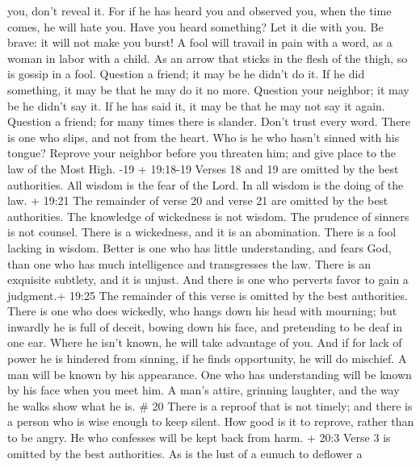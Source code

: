 you, don't reveal it.  For if he has heard you and observed
you, when the time comes, he will hate you.  Have you heard
something? Let it die with you. Be brave: it will not make you burst!
 A fool will travail in pain with a word, as a woman in
labor with a child.  As an arrow that sticks in the flesh
of the thigh, so is gossip in a fool.  Question a friend;
it may be he didn't do it. If he did something, it may be that he may do
it no more.  Question your neighbor; it may be he didn't
say it. If he has said it, it may be that he may not say it again.
 Question a friend; for many times there is slander. Don't
trust every word.  There is one who slips, and not from the
heart. Who is he who hasn't sinned with his tongue? 
Reprove your neighbor before you threaten him; and give place to the law
of the Most High. -19 + 19:18-19 Verses 18 and 19 are
omitted by the best authorities.  All wisdom is the fear of
the Lord. In all wisdom is the doing of the law.  + 19:21
The remainder of verse 20 and verse 21 are omitted by the best
authorities.  The knowledge of wickedness is not wisdom.
The prudence of sinners is not counsel.  There is a
wickedness, and it is an abomination. There is a fool lacking in wisdom.
 Better is one who has little understanding, and fears God,
than one who has much intelligence and transgresses the law.
 There is an exquisite subtlety, and it is unjust. And
there is one who perverts favor to gain a judgment.+ 19:25 The remainder
of this verse is omitted by the best authorities.  There is
one who does wickedly, who hangs down his head with mourning; but
inwardly he is full of deceit,  bowing down his face, and
pretending to be deaf in one ear. Where he isn't known, he will take
advantage of you.  And if for lack of power he is hindered
from sinning, if he finds opportunity, he will do mischief.
 A man will be known by his appearance. One who has
understanding will be known by his face when you meet him. 
A man's attire, grinning laughter, and the way he walks show what he is.
\# 20  There is a reproof that is not timely; and there is a
person who is wise enough to keep silent.  How good is it to
reprove, rather than to be angry. He who confesses will be kept back
from harm.  + 20:3 Verse 3 is omitted by the best
authorities.  As is the lust of a eunuch to deflower a
